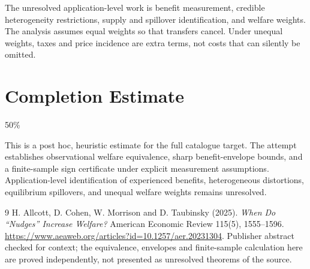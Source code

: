 \documentclass[11pt]{article}
\theoremstyle{definition}
\begin{document}
The unresolved application-level work is benefit measurement, credible
heterogeneity restrictions, supply and spillover identification, and welfare
weights. The analysis assumes equal weights so that transfers cancel. Under
unequal weights, taxes and price incidence are extra terms, not costs that can
silently be omitted.

\section{Completion Estimate}
50\%

This is a post hoc, heuristic estimate for the full catalogue target.
The attempt establishes observational welfare equivalence, sharp benefit-envelope bounds, and a finite-sample sign certificate under explicit measurement assumptions. Application-level identification of experienced benefits, heterogeneous distortions, equilibrium spillovers, and unequal welfare weights remains unresolved.

\begin{thebibliography}{9}
 H. Allcott, D. Cohen, W. Morrison and D. Taubinsky (2025).
\emph{When Do ``Nudges'' Increase Welfare?} American Economic Review 115(5),
1555--1596. \url{https://www.aeaweb.org/articles?id=10.1257/aer.20231304}.
Publisher abstract checked for context; the equivalence, envelopes and
finite-sample calculation here are proved independently, not presented as
unresolved theorems of the source.
\end{thebibliography}
\end{document}
